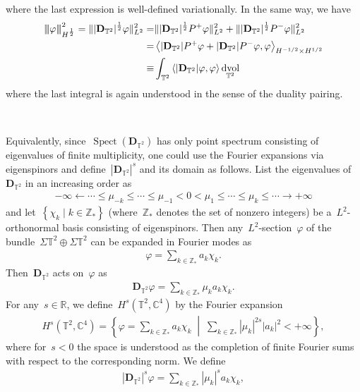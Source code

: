 \documentclass[10pt,a4paper]{amsart}
\newcommand{\tnorm}[1]{%
  \left\vert\kern-0.3ex\left\vert\kern-0.3ex\left\vert #1 \right\vert\kern-0.3ex\right\vert\kern-0.3ex\right\vert
}
\newcommand{\R}{\mathbb{R}}
\newcommand{\C}{\mathbb{C}}
\newcommand{\T}{\mathbb{T}}
\newcommand{\dd}{\mathop{}\!\mathrm{d}}
\newcommand{\pD}{\mathbf{D}}
\newcommand{\Abracket}[1]{\left<#1\right>} %
\newcommand{\braces}[1]{\left\{#1\right\}} %
\DeclareMathOperator{\dv}{\dd{vol}}
\DeclareMathOperator{\Spect}{Spect}
\begin{document}
where the last expression is well-defined variationally.  
In the same way, we have 
\begin{align}
    \tnorm{\varphi}_{H^{\frac{1}{2}}}^2 = \| |\pD_{\T^2}|^{\frac{1}{2}}\varphi \|_{L^2}^2 
    =&\| |\pD_{\T^2}|^{\frac{1}{2}}P^+\varphi\|_{L^2}^2 
     + \| |\pD_{\T^2}|^{\frac{1}{2}}P^-\varphi\|_{L^2}^2 \\
     =& \Abracket{|\pD_{\T^2}|P^+\varphi +|\pD_{\T^2}|P^-\varphi ,\varphi}_{H^{-1/2}\times H^{1/2}} \\
     \equiv & \int_{\T^2}\Abracket{|\pD_{\T^2}|\varphi,\varphi}\dv_{\T^2}
\end{align}
where the last integral is again understood in the sense of the duality pairing. 


\ 

Equivalently, since~$\Spect(\pD_{\T^2})$ has only point spectrum consisting of eigenvalues of finite multiplicity, one could use the Fourier expansions via eigenspinors and define~$|\pD_{\T^2}|^s$ and its domain as follows. 
List the eigenvalues of~$\pD_{\T^2}$ in an increasing order as 
\begin{align}
    -\infty \leftarrow \cdots \leq 
    \mu_{-k}\leq \cdots \leq \mu_{-1} <0 < \mu_1 \leq \cdots \leq \mu_k \leq \cdots \to +\infty
\end{align}
and let~$\braces{ \chi_k\mid k \in\mathbb{Z}_*}$ (where~$\mathbb{Z}_*$ denotes the set of nonzero integers) be a~$L^2$-orthonormal basis consisting of eigenspinors. 
Then any~$L^2$-section~$\varphi$ of the bundle~$\Sigma\T^2 \oplus \Sigma\T^2$ can be expanded in Fourier modes as 
\begin{align}
    \varphi=\sum_{k\in \mathbb{Z}_*} a_k \chi_k. 
\end{align}
Then~$\pD_{\T^2}$ acts on~$\varphi$ as
\begin{align}
    \pD_{\T^2}\varphi=\sum_{k\in\mathbb{Z}_*} \mu_k a_k \chi_k.
\end{align}
For any~$s\in\R$, we define~$H^s(\T^2,\C^4)$ by the Fourier expansion
\begin{align}
    H^s(\T^2,\C^4)
    =
    \braces{
        \varphi=\sum_{k\in\mathbb Z_*}a_k\chi_k
        \;\middle|\;
        \sum_{k\in\mathbb Z_*}|\mu_k|^{2s}|a_k|^2<+\infty
    },
\end{align}
where for~$s<0$ the space is understood as the completion of finite
Fourier sums with respect to the corresponding norm.
We define
\begin{align}
    |\pD_{\T^2}|^s\varphi
    =
    \sum_{k\in\mathbb Z_*}|\mu_k|^s a_k\chi_k,
\end{align}
\end{document}
